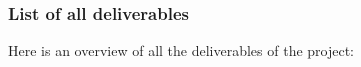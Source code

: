\subsubsection*{List of all deliverables}\label{sec:deliverables}

Here is an overview of all the deliverables of the project:

{\footnotesize{}}

